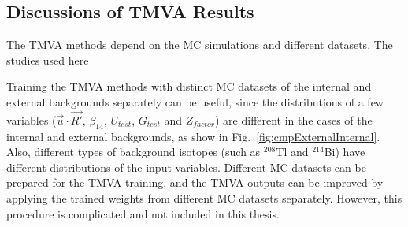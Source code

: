 {\subsection{Discussions of TMVA Results}\label{sect:TMVAdiscussion}

The TMVA methods depend on the MC simulations and different datasets. The studies used here 

Training the TMVA methods with distinct MC datasets of the internal and external backgrounds separately can be useful, since the distributions of a few variables ($\vec{u}\cdot\vec{R'}$, $\beta_{14}$, $U_{test}$, $G_{test}$ and $Z_{factor}$) are different in the cases of the internal and external backgrounds, as show in Fig.~\ref{fig:cmpExternalInternal}. Also, different types of background isotopes (such as $^{208}$Tl and $^{214}$Bi) have different distributions of the input variables. Different MC datasets can be prepared for the TMVA training, and the TMVA outputs can be improved by applying the trained weights from different MC datasets separately. However, this procedure is complicated and not included in this thesis. 

}
